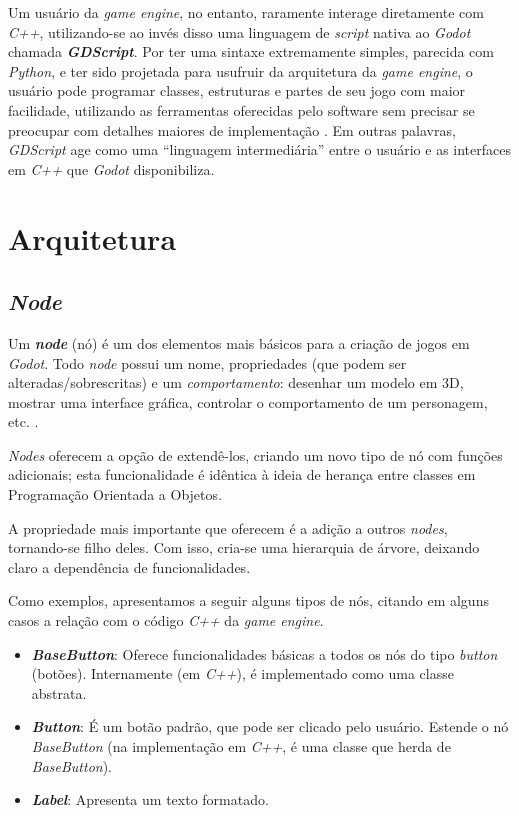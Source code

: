 Um usuário da \textit{game engine}, no entanto, raramente interage diretamente com \textit{C++}, utilizando-se ao invés disso uma linguagem de \textit{script} nativa ao \textit{Godot} chamada \mbox{\textbf{\textit{GDScript}}}. Por ter uma sintaxe extremamente simples, parecida com \textit{Python}, e ter sido projetada para usufruir da arquitetura da \textit{game engine}, o usuário pode programar classes, estruturas e partes de seu jogo com maior facilidade, utilizando as ferramentas oferecidas pelo software sem precisar se preocupar com detalhes maiores de implementação \citep{godotGDScript}. Em outras palavras, \mbox{\textit{GDScript}} age como uma ``linguagem intermediária'' entre o usuário e as interfaces em \textit{C++} que \textit{Godot} disponibiliza.


\section{Arquitetura}


\subsection{\textit{Node}}

Um \textbf{\textit{node}} (nó) é um dos elementos mais básicos para a criação de jogos em \textit{Godot}. Todo \textit{node} possui um nome, propriedades (que podem ser alteradas/sobrescritas) e um \emph{comportamento}: desenhar um modelo em 3D, mostrar uma interface gráfica, controlar o comportamento de um personagem, etc. \citep{godotNode}.

\textit{Nodes} oferecem a opção de extendê-los, criando um novo tipo de nó com funções adicionais; esta funcionalidade é idêntica à ideia de herança entre classes em Programação Orientada a Objetos.

A propriedade mais importante que oferecem é a adição a outros \textit{nodes}, tornando-se filho deles. Com isso, cria-se uma hierarquia de árvore, deixando claro a dependência de funcionalidades.

Como exemplos, apresentamos a seguir alguns tipos de nós, citando em alguns casos a relação com o código \textit{C++} da \textit{game engine}.

\begin{itemize}
\item \textbf{\textit{BaseButton}}: Oferece funcionalidades básicas a todos os nós do tipo \textit{button} (botões). Internamente (em \textit{C++}), é implementado como uma classe abstrata.

\item \textbf{\textit{Button}}: É um botão padrão, que pode ser clicado pelo usuário. Estende o nó \textit{BaseButton} (na implementação em \textit{C++}, é uma classe que herda de \textit{BaseButton}).

\item \textbf{\textit{Label}}: Apresenta um texto formatado.
\end{itemize}

